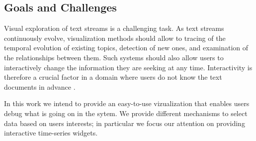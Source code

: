 \documentclass{article}
\begin{document}
\subsection{Goals and Challenges}

Visual exploration of text streams is a challenging task. As text streams continuously evolve, visualization methods should allow to tracing of the temporal evolution of existing topics, detection of new ones, and examination of the relationships between them. 
Such systems should also allow users to interactively change the information they are seeking at any time. 
Interactivity is therefore a crucial factor in a domain where users do not know the text documents in advance \cite{AlsakranCLZYDL12}.

In this work we intend to provide an easy-to-use vizualization that enables users debug what is going on in the sytem. We provide different mechanisms to select data based on users interests; in particular we focus our attention on providing interactive time-series widgets.
\end{document}
